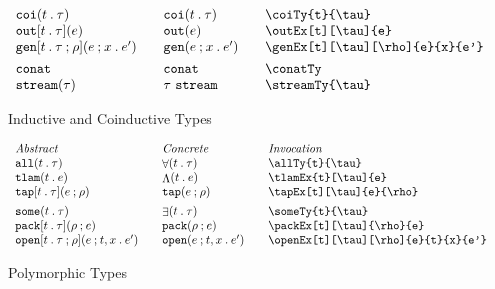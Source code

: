 \documentclass[11pt]{article}
\begin{document}
\begin{figure}
\begin{small}
\begin{displaymath}
\begin{array}{l@{\qquad}l@{\qquad}l@{\qquad}l}
        \coiTy{t}{\tau}                      & \coiTy*{t}{\tau}                    & \verb|\coiTy{t}{\tau}|                         \\
        \outEx[t][\tau]{e}                   & \outEx*{e}                          & \verb|\outEx[t][\tau]{e}|                      \\
        \genEx[t][\tau][\rho]{e}{x}{e'}    & \genEx*{e}{x}{e'}                   & \verb|\genEx[t][\tau][\rho]{e}{x}{e'}|       \\[1ex]

        \conatTy                             & \conatTy*                           & \verb|\conatTy|                                \\
        \streamTy{\tau}                      & \streamTy*{\tau}                    & \verb|\streamTy{\tau}|
      \end{array}
    \end{displaymath}
  \end{small}

  \caption{Inductive and Coinductive Types}
  \label{fig:icoi}
\end{figure}

\begin{figure}

  \begin{small}
    \begin{displaymath}
      \begin{array}{l@{\qquad}l@{\qquad}l@{\qquad}l}
        \textit{Abstract} & \textit{Concrete} & \textit{Invocation} \\
        \allTy{t}{\tau}                     & \allTy*{t}{\tau}                     & \verb|\allTy{t}{\tau}|                     \\
        \tlamEx{t}[\tau]{e}                 & \tlamEx*{t}{e}                       & \verb|\tlamEx{t}[\tau]{e}|                 \\
        \tapEx[t][\tau]{e}{\rho}          & \tapEx*{e}{\rho}                   & \verb|\tapEx[t][\tau]{e}{\rho}|          \\[1ex]
        \someTy{t}{\tau}                    & \someTy*{t}{\tau}                    & \verb|\someTy{t}{\tau}|                    \\
        \packEx[t][\tau]{\rho}{e}           & \packEx*{\rho}{e}                    & \verb|\packEx[t][\tau]{\rho}{e}|           \\
        \openEx[t][\tau][\rho]{e}{t}{x}{e'} & \openEx*[t][\tau][\rho]{e}{t}{x}{e'} & \verb|\openEx[t][\tau][\rho]{e}{t}{x}{e'}|
      \end{array}
    \end{displaymath}
  \end{small}

  \caption{Polymorphic Types}
  \label{fig:poly}
\end{figure}
\end{document}
